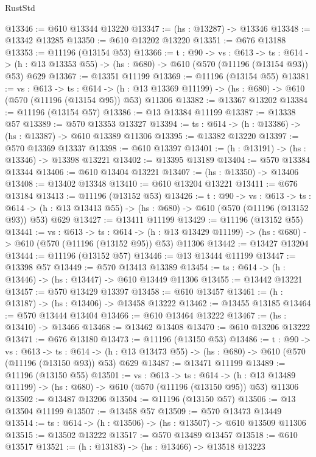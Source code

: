 \begin{lexlean}{RustStd}
\begin{coremodule}
@13346 := @610 @13344 @13220
@13347 := (hs : @13287) -> @13346
@13348 := @13342 @13285
@13350 := @610 @13202 @13220
@13351 := @676 @13188
@13353 := @11196 (@13154 @53)
@13366 := {t : @90} ->
  {vs : @613} ->
  {ts : @614} -> (h : @13 @13353 @55) -> (hs : @680) -> @610 (@570 (@11196 (@13154 @93)) @53) @629
@13367 := @13351 @11199
@13369 := @11196 (@13154 @55)
@13381 := {vs : @613} ->
  {ts : @614} ->
  (h : @13 @13369 @11199) -> (hs : @680) -> @610 (@570 (@11196 (@13154 @95)) @53) @11306
@13382 := @13367 @13202
@13384 := @11196 (@13154 @57)
@13386 := @13 @13384 @11199
@13387 := @13338 @57
@13389 := @570 @13353 @13327
@13394 := {ts : @614} -> (h : @13386) -> (hs : @13387) -> @610 @13389 @11306
@13395 := @13382 @13220
@13397 := @570 @13369 @13337
@13398 := @610 @13397
@13401 := (h : @13191) -> (hs : @13346) -> @13398 @13221
@13402 := @13395 @13189
@13404 := @570 @13384 @13344
@13406 := @610 @13404 @13221
@13407 := (hs : @13350) -> @13406
@13408 := @13402 @13348
@13410 := @610 @13204 @13221
@13411 := @676 @13184
@13413 := @11196 (@13152 @53)
@13426 := {t : @90} ->
  {vs : @613} ->
  {ts : @614} -> (h : @13 @13413 @55) -> (hs : @680) -> @610 (@570 (@11196 (@13152 @93)) @53) @629
@13427 := @13411 @11199
@13429 := @11196 (@13152 @55)
@13441 := {vs : @613} ->
  {ts : @614} ->
  (h : @13 @13429 @11199) -> (hs : @680) -> @610 (@570 (@11196 (@13152 @95)) @53) @11306
@13442 := @13427 @13204
@13444 := @11196 (@13152 @57)
@13446 := @13 @13444 @11199
@13447 := @13398 @57
@13449 := @570 @13413 @13389
@13454 := {ts : @614} -> (h : @13446) -> (hs : @13447) -> @610 @13449 @11306
@13455 := @13442 @13221
@13457 := @570 @13429 @13397
@13458 := @610 @13457
@13461 := (h : @13187) -> (hs : @13406) -> @13458 @13222
@13462 := @13455 @13185
@13464 := @570 @13444 @13404
@13466 := @610 @13464 @13222
@13467 := (hs : @13410) -> @13466
@13468 := @13462 @13408
@13470 := @610 @13206 @13222
@13471 := @676 @13180
@13473 := @11196 (@13150 @53)
@13486 := {t : @90} ->
  {vs : @613} ->
  {ts : @614} -> (h : @13 @13473 @55) -> (hs : @680) -> @610 (@570 (@11196 (@13150 @93)) @53) @629
@13487 := @13471 @11199
@13489 := @11196 (@13150 @55)
@13501 := {vs : @613} ->
  {ts : @614} ->
  (h : @13 @13489 @11199) -> (hs : @680) -> @610 (@570 (@11196 (@13150 @95)) @53) @11306
@13502 := @13487 @13206
@13504 := @11196 (@13150 @57)
@13506 := @13 @13504 @11199
@13507 := @13458 @57
@13509 := @570 @13473 @13449
@13514 := {ts : @614} -> (h : @13506) -> (hs : @13507) -> @610 @13509 @11306
@13515 := @13502 @13222
@13517 := @570 @13489 @13457
@13518 := @610 @13517
@13521 := (h : @13183) -> (hs : @13466) -> @13518 @13223

\end{coremodule}
\end{lexlean}
